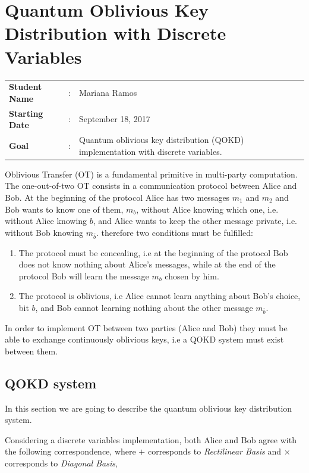 \clearpage
\section{Quantum Oblivious Key Distribution with Discrete Variables}

\begin{tcolorbox}	
\begin{tabular}{p{2.75cm} p{0.2cm} p{10.5cm}} 	
\textbf{Student Name}  &:& Mariana Ramos\\
\textbf{Starting Date} &:& September 18, 2017\\
\textbf{Goal}          &:& Quantum oblivious key distribution (QOKD) implementation with discrete variables.
\end{tabular}
\end{tcolorbox}

Oblivious Transfer (OT) is a fundamental primitive in multi-party computation. The one-out-of-two OT consists in a communication protocol between Alice and Bob. At the beginning of the protocol Alice has two messages $m_1$ and $m_2$ and Bob wants to know one of them, $m_b$, without Alice knowing which one, i.e. without Alice knowing $b$, and Alice wants to keep the other message private, i.e. without Bob knowing $m_{\bar{b}}$. therefore two conditions must be fulfilled:
\begin{enumerate}
	\item{The protocol must be concealing, i.e at the beginning of the protocol Bob does not know nothing about Alice's messages, while at the end of the protocol Bob will learn the message $m_{b}$ chosen by him.}
	\item{The protocol is oblivious, i.e Alice cannot learn anything about Bob's choice, bit $b$, and Bob cannot learning nothing about the other message $m_{\bar{b}}$.}
\end {enumerate}

In order to implement OT between two parties (Alice and Bob) they must be able to exchange continuously oblivious keys, i.e a QOKD system must exist between them.

\subsection{QOKD system}

In this section we are going to describe the quantum oblivious key distribution system.

Considering a discrete variables implementation, both Alice and Bob agree with the following correspondence, where $+$ corresponds to \textit{Rectilinear Basis} and $\times$ corresponds to \textit{Diagonal Basis},

